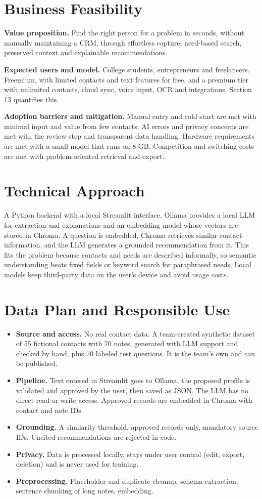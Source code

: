 \documentclass[11pt,letterpaper]{article}
\begin{document}
\section{Business Feasibility}
\textbf{Value proposition.} Find the right person for a problem in seconds, without manually maintaining a CRM, through effortless capture, need-based search, preserved context and explainable recommendations.

\textbf{Expected users and model.} College students, entrepreneurs and freelancers. Freemium, with limited contacts and text features for free, and a premium tier with unlimited contacts, cloud sync, voice input, OCR and integrations. Section 13 quantifies this.

\textbf{Adoption barriers and mitigation.} Manual entry and cold start are met with minimal input and value from few contacts. AI errors and privacy concerns are met with the review step and transparent data handling. Hardware requirements are met with a small model that runs on 8 GB. Competition and switching costs are met with problem-oriented retrieval and export.

\section{Technical Approach}
A Python backend with a local Streamlit interface. Ollama provides a local LLM for extraction and explanations and an embedding model whose vectors are stored in Chroma. A question is embedded, Chroma retrieves similar contact information, and the LLM generates a grounded recommendation from it. This fits the problem because contacts and needs are described informally, so semantic understanding beats fixed fields or keyword search for paraphrased needs. Local models keep third-party data on the user's device and avoid usage costs.

\section{Data Plan and Responsible Use}
\begin{itemize}
  \item \textbf{Source and access.} No real contact data. A team-created synthetic dataset of 55 fictional contacts with 70 notes, generated with LLM support and checked by hand, plus 70 labeled test questions. It is the team's own and can be published.
  \item \textbf{Pipeline.} Text entered in Streamlit goes to Ollama, the proposed profile is validated and approved by the user, then saved as JSON. The LLM has no direct read or write access. Approved records are embedded in Chroma with contact and note IDs.
  \item \textbf{Grounding.} A similarity threshold, approved records only, mandatory source IDs. Uncited recommendations are rejected in code.
  \item \textbf{Privacy.} Data is processed locally, stays under user control (edit, export, deletion) and is never used for training.
  \item \textbf{Preprocessing.} Placeholder and duplicate cleanup, schema extraction, sentence chunking of long notes, embedding.
\end{itemize}
\end{document}
